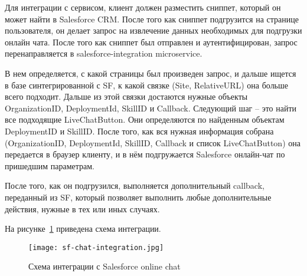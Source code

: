 Для интеграции с  сервисом, клиент должен разместить сниппет, который он может найти в Salesforce CRM. После того как сниппет подгрузится на странице пользователя, он делает запрос на извлечение данных необходимых для подгрузки онлайн чата. После того как сниппет был отправлен и аутентифицирован, запрос перенаправляется в salesforce-integration microservice. 

В нем определяется, с какой страницы был произведен запрос, и дальше ищется в базе синтегрированной с  SF, к какой связке (Site, RelativeURL) она больше всего подходит. Дальше из этой связки достаются нужные объекты OrganizationID, DeploymentId, SkillID и Callback. Следующий шаг -- это найти все подходящие LiveChatButton. Они определяются по найденным объектам DeploymentID и SkillID. После того, как вся нужная информация собрана (OrganizationID, DeploymentId, SkillID, Callback и список LiveChatButton) она передается в браузер клиенту, и в нём подгружается Salesforce онлайн-чат по пришедшим параметрам.

После того, как он подгрузился, выполняется дополнительный callback, переданный из SF, который позволяет выполнить любые дополнительные действия, нужные в тех или иных случаях. 

На рисунке~\ref{fig:chat-integration} приведена схема интеграции.
\begin{figure}[h]
\centering
  \texttt{[image: sf-chat-integration.jpg]}  
  \caption{Схема интеграции с Salesforce online chat}
  \label{fig:chat-integration}
\end{figure} 


